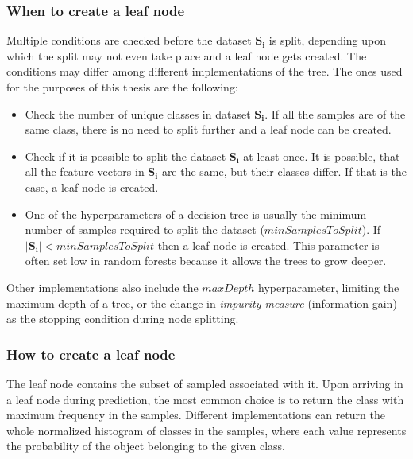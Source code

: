\documentclass[11pt]{article}
\begin{document}
      \subsubsection{When to create a leaf node}
        Multiple conditions are checked before the dataset $\mathbf{S_i}$ is split, depending upon which the split may not even take place and a leaf node gets created. The conditions may differ among different implementations of the tree. The ones used for the purposes of this thesis are the following:
        \begin{itemize}
          \item Check the number of unique classes in dataset $\mathbf{S_i}$. If all the samples are of the same class, there is no need to split further and a leaf node can be created. \cite{brabec}
          \item Check if it is possible to split the dataset $\mathbf{S_i}$ at least once. It is possible, that all the feature vectors in $\mathbf{S_i}$ are the same, but their classes differ. If that is the case, a leaf node is created. \cite{brabec}
          \item One of the hyperparameters of a decision tree is usually the minimum number of samples required to split the dataset ($minSamplesToSplit$). If $|\mathbf{S_i}| < minSamplesToSplit$ then a leaf node is created. This parameter is often set low in random forests because it allows the trees to grow deeper. \cite{brabec}
        \end{itemize}
        Other implementations also include the $maxDepth$ hyperparameter, limiting the maximum depth of a tree, or the change in {\it impurity measure} (information gain) as the stopping condition during node splitting. \cite{brabec}
      \subsubsection{How to create a leaf node}
        The leaf node contains the subset of sampled associated with it. Upon arriving in a leaf node during prediction, the most common choice is to return the class with maximum frequency in the samples. Different implementations can return the whole normalized histogram of classes in the samples, where each value represents the probability of the object belonging to the given class.
\end{document}
